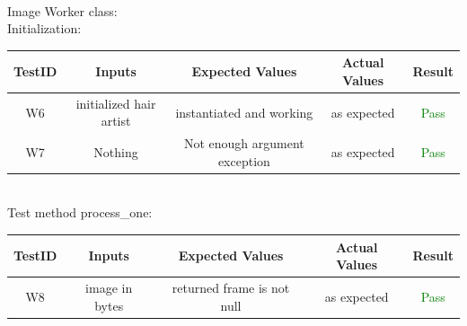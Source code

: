 \documentclass[12pt, titlepage]{article}
\begin{document}
\\ \newline
Image Worker class: \\
Initialization: \\ 
\newline
\begin{tabular}{ |c|c|c|c|c| } 
 \hline
 TestID & Inputs & Expected Values & Actual Values & Result \\ 
 \hline
W6 & initialized hair artist & instantiated and working & as expected & \textcolor{green}{Pass} \\
W7 & Nothing & Not enough argument exception & as expected & \textcolor{green}{Pass} \\
 \hline
\end{tabular}
\\ \newline
Test method process\_one: \\
\newline
\begin{tabular}{ |c|c|c|c|c| } 
 \hline
 TestID & Inputs & Expected Values & Actual Values & Result \\ 
 \hline
W8 & image in bytes & returned frame is not null & as expected & \textcolor{green}{Pass} \\
 \hline
\end{tabular}
\end{document}
